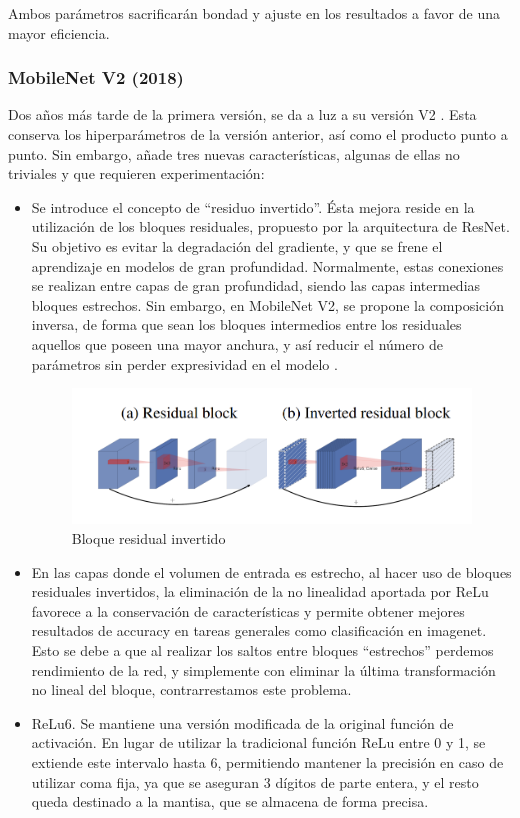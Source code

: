 Ambos parámetros sacrificarán bondad y ajuste en los resultados a favor de una mayor eficiencia.

\subsubsection{MobileNet V2 (2018)}

Dos años más tarde de la primera versión, se da a luz a su versión V2  \cite{sandler2019mobilenetv2}. Esta conserva los hiperparámetros  de la versión anterior, así como el producto punto a punto. Sin embargo, añade tres nuevas características, algunas de ellas no triviales y que requieren experimentación:
\begin{itemize}
    \item Se introduce el concepto de ``residuo invertido''. Ésta mejora reside en la utilización de los bloques residuales, propuesto por la arquitectura de ResNet. Su objetivo es evitar la degradación del gradiente, y que se frene el aprendizaje en modelos de gran profundidad. Normalmente, estas conexiones se realizan entre capas de gran profundidad, siendo las capas intermedias bloques estrechos. Sin embargo, en MobileNet V2, se propone la composición inversa, de forma que sean los bloques intermedios entre los residuales aquellos que poseen una mayor anchura, y así reducir el número de parámetros sin perder expresividad en el modelo \cite{invertedresidualsv2}.
    \begin{figure}[H]
    	\label{invert}
    	\centering
    	\includegraphics[scale = 0.25]{imagenes/invertedres.png}
    	\caption{Bloque residual invertido}
    \end{figure}
    
     \item En las capas donde el volumen de entrada es estrecho, al hacer uso de bloques residuales invertidos, la eliminación de la no linealidad aportada por ReLu favorece a la conservación de características y permite obtener mejores resultados de accuracy en tareas generales como clasificación en imagenet. Esto se debe a que al realizar los saltos entre bloques ``estrechos'' perdemos rendimiento de la red, y simplemente con eliminar la última transformación no lineal del bloque, contrarrestamos este problema.
    \item ReLu6. Se mantiene una versión modificada de la original función de activación. En lugar de utilizar la tradicional función ReLu entre 0 y 1, se extiende este intervalo hasta 6, permitiendo mantener la precisión en caso de utilizar coma fija, ya que se aseguran 3 dígitos de parte entera, y el resto queda destinado a la mantisa, que se almacena de forma precisa.
\end{itemize}


